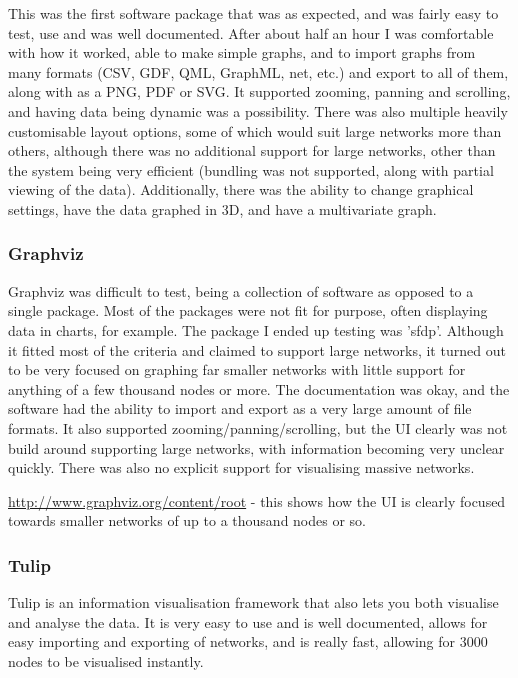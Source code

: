 \documentclass[../dissertation.tex]{subfiles}
\begin{document}
This was the first software package that was as expected, and was fairly easy to test, use and was well documented. After about half an hour I was comfortable with how it worked, able to make simple graphs, and to import graphs from many formats (CSV, GDF, QML, GraphML, net, etc.) and export to all of them, along with as a PNG, PDF or SVG. It supported zooming, panning and scrolling, and having data being dynamic was a possibility. There was also multiple heavily customisable layout options, some of which would suit large networks more than others, although there was no additional support for large networks, other than the system being very efficient (bundling was not supported, along with partial viewing of the data). Additionally, there was the ability to change graphical settings, have the data graphed in 3D, and have a multivariate graph.

\subsubsection{Graphviz}

Graphviz was difficult to test, being a collection of software as opposed to a single package. Most of the packages were not fit for purpose, often displaying data in charts, for example. The package I ended up testing was 'sfdp'. Although it fitted most of the criteria and claimed to support large networks, it turned out to be very focused on graphing far smaller networks with little support for anything of a few thousand nodes or more. The documentation was okay, and the software had the ability to import and export as a very large amount of file formats. It also supported zooming/panning/scrolling, but the UI clearly was not build around supporting large networks, with information becoming very unclear quickly. There was also no explicit support for visualising massive networks.

\url{http://www.graphviz.org/content/root} - this shows how the UI is clearly focused towards smaller networks of up to a thousand nodes or so.

\subsubsection{Tulip}

Tulip is an information visualisation framework that also lets you both visualise and analyse the data. It is very easy to use and is well documented, allows for easy importing and exporting of networks, and is really fast, allowing for 3000 nodes to be visualised instantly. 
\end{document}

